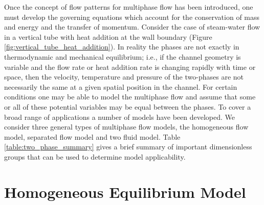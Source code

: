 Once the concept of flow patterns for multiphase flow has been introduced, one must develop the governing equations which account for the conservation of mass and energy and the transfer of momentum.
Consider the case of steam-water flow in a vertical tube with heat addition at the wall boundary (Figure \ref{fig:vertical_tube_heat_addition}).
In reality the phases are not exactly in thermodynamic and mechanical equilibrium; i.e., if the channel geometry is variable and the flow rate or heat addition rate is changing rapidly with time or space, then the velocity, temperature and pressure of the two-phases are not necessarily the same at a given spatial position in the channel.
For certain conditions one may be able to model the multiphase flow and assume that some or all of these potential variables may be equal between the phases.
To cover a broad range of applications a number of models have been developed.
We consider three general types of multiphase flow models, the homogeneous flow model, separated flow model and two fluid model.
Table \ref{table:two_phase_summary} gives a brief summary of important dimensionless groups that can be used to determine model applicability.
\renewcommand*\arraystretch{1.5}

\section{Homogeneous Equilibrium Model}

